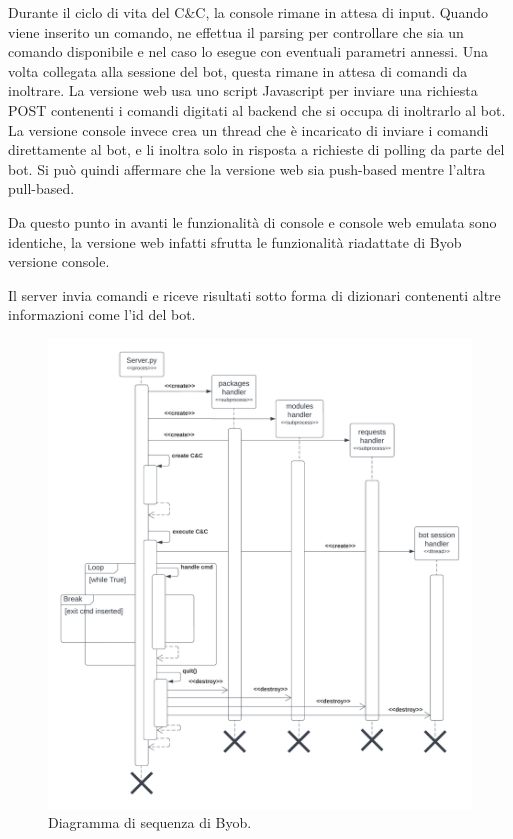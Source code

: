 Durante il ciclo di vita del C\&C, la console  rimane in attesa di input. Quando viene inserito un comando,  ne effettua il parsing per controllare che sia un comando disponibile e nel caso lo esegue con eventuali parametri annessi.
 Una volta collegata alla sessione del bot, questa rimane in attesa di comandi da inoltrare. 
 La versione web usa uno script Javascript per inviare una richiesta POST contenenti i comandi digitati al backend che si occupa di inoltrarlo al bot.
 La versione console invece crea un thread che è incaricato di inviare i comandi direttamente al bot, e li inoltra solo in risposta a richieste di polling da parte del bot.
 Si può quindi affermare che la versione web sia push-based mentre l'altra pull-based.
 
 Da questo punto in avanti le funzionalità di console e  console web emulata sono identiche, la versione web infatti sfrutta le funzionalità riadattate di Byob versione console.

Il server invia comandi e riceve risultati sotto forma di dizionari contenenti altre informazioni come l'id del bot.


\begin{figure}
    \centering
    \includegraphics[width=\textwidth]{res/fig/byob-uml-server.png}
    \caption{Diagramma di sequenza di Byob.}
    \label{fig:byobumlserver}
\end{figure}


